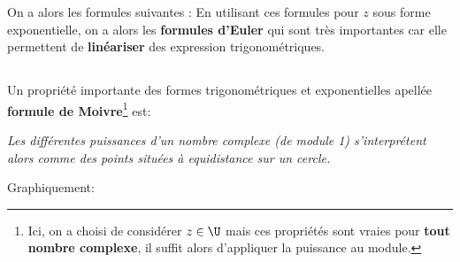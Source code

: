 On a alors les formules suivantes {:}
En utilisant ces formules pour \(z\) sous forme exponentielle, on a alors les \textbf{formules d'Euler} qui sont très importantes car elle permettent de \textbf{linéariser} des expression trigonométriques.\<

\subsection*{}
Un propriété importante des formes trigonométriques et exponentielles apellée \textbf{formule de Moivre}\footnote[1]{Ici, on a choisi de considérer \(z \in \U\) mais ces propriétés sont vraies pour \textbf{tout nombre complexe}, il suffit alors d'appliquer la puissance au module.} est:
\begin{center}
    \textit{Les différentes puissances d'un nombre complexe (de module 1) s'interprétent alors comme des points situées à equidistance sur un cercle.}
\end{center}
Graphiquement:
